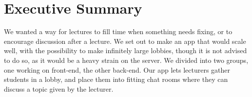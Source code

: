 \section {Executive Summary}
We wanted a way for lectures to fill time when something needs fixing, or to encourage discussion after a lecture. We set out to make an app that would scale well, with the possibility to make infinitely large lobbies, though it is not advised to do so, as it would be a heavy strain on the server. We divided into two groups, one working on front-end, the other back-end. Our app lets lecturers gather students in a lobby, and place them into fitting chat rooms where they can discuss a topic given by the lecturer.